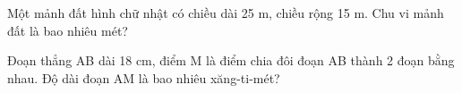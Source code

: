 \begin{ex} %
Một mảnh đất hình chữ nhật có chiều dài 25 m, chiều rộng 15 m. Chu vi mảnh đất là bao nhiêu mét?
\end{ex}

\begin{ex} %
Đoạn thẳng AB dài 18 cm, điểm M là điểm chia đôi đoạn AB thành 2 đoạn bằng nhau. Độ dài đoạn AM là bao nhiêu xăng-ti-mét?
\end{ex}
